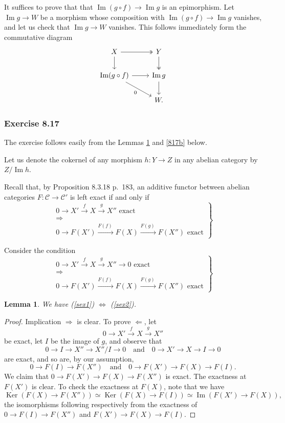 \documentclass[12pt]{article}%
\newtheorem{lem}[thm]{Lemma}
\theoremstyle{remark}
\theoremstyle{definition}
\newcommand{\C}{\mathcal C}
\newcommand{\then}{\Rightarrow}
\newcommand{\si}{\Leftarrow}
\newcommand{\ssi}{\Leftrightarrow}%
\DeclareMathOperator{\Ima}{Im}
\DeclareMathOperator{\Ker}{Ker}
\begin{document}
It suffices to prove that that $\Ima(g\circ f)\to\Ima g$ is an epimorphism. Let $\Ima g\to W$ be a morphism whose composition with $\Ima(g\circ f)\to\Ima g$ vanishes, and let us check that $\Ima g\to W$ vanishes. This follows immediately form the commutative diagram 
$$
\begin{tikzcd}
X\ar{d}\ar[two heads]{r}&Y\ar[two heads]{d}\\ 
\Ima(g\circ f)\ar{dr}[swap]{0}\ar{r}&\Ima g\ar{d}\\ 
{}&W.
\end{tikzcd}
$$
%
%
\subsubsection{Exercise 8.17}
%
The exercise follows easily from the Lemmas \ref{817a} and \ref{817b} below.

Let us denote the cokernel of any morphism $h:Y\to Z$ in any abelian category by $Z/\Ima h$. 

Recall that, by Proposition 8.3.18 p.~183, an additive functor between abelian categories $F:\C\to\C'$ is left exact if and only if
%
\begin{equation}\label{sex1}
\left.
\begin{matrix}
0\to X'\overset{f}{\to}X\overset{g}{\to}X''\text{ exact }\\ 
\then\\ 
0\to F(X')\overset{F(f)\ }{\longrightarrow}F(X)\overset{F(g)\ }{\longrightarrow}F(X'')\text{ exact}
\end{matrix}
\right\}
\end{equation}

Consider the condition
%
\begin{equation}\label{sex2}
\left.
\begin{matrix}
0\to X'\overset{f}{\to}X\overset{g}{\to}X''\to0\text{ exact }\\ 
\then\\ 
0\to F(X')\overset{F(f)\ }{\longrightarrow}F(X)\overset{F(g)\ }{\longrightarrow}F(X'')\text{ exact}
\end{matrix}
\right\}
\end{equation}
%
\begin{lem}\label{817a}
We have (\ref{sex1}) $\ssi$ (\ref{sex2}). 
\end{lem}
%
\begin{proof}
Implication $\then$ is clear. To prove $\si$, let 
$$
0\to X'\overset{f}{\to}X\overset{g}{\to}X''
$$
be exact, let $I$ be the image of $g$, and observe that 
$$
0\to I\to X''\to X''/I\to0\quad\text{and}\quad0\to X'\to X\to I\to0
$$ 
are exact, and so are, by our assumption, 
$$
0\to F(I)\to F(X'')\quad\text{and}\quad0\to F(X')\to F(X)\to F(I).
$$ 
We claim that $0\to F(X')\to F(X)\to F(X'')$ is exact. The exactness at $F(X')$ is clear. To check the exactness at $F(X)$, note that we have 
$$
\Ker(F(X)\to F(X''))\simeq\Ker(F(X)\to F(I))\simeq\Ima(F(X')\to F(X)),
$$ 
the isomorphisms following respectively from the exactness of $0\to F(I)\to F(X'')$ and $F(X')\to F(X)\to F(I)$.
\end{proof}
\end{document}
